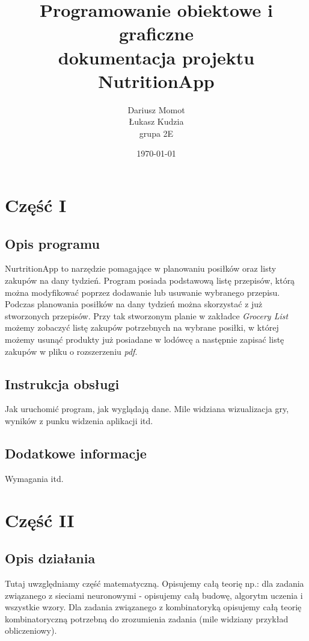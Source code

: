 \documentclass[12pt,a4paper]{article}
\begin{document}
	
	\title{Programowanie obiektowe i graficzne\\\small{dokumentacja projektu NutritionApp}}
	\author{Dariusz Momot \\ Łukasz Kudzia \\ grupa 2E}
	\date{\today}

	\maketitle
	\newpage
	\section*{Część I}
	\subsection*{Opis programu}
	NurtritionApp to narzędzie pomagające w planowaniu posiłków oraz listy zakupów na dany tydzień.
	Program posiada podstawową listę przepisów, którą można modyfikować poprzez dodawanie lub usuwanie wybranego przepisu.
	Podczas planowania posiłków na dany tydzień można skorzystać z już stworzonych przepisów.
	Przy tak stworzonym planie w zakładce \textit{Grocery List} możemy zobaczyć listę zakupów potrzebnych na wybrane posiłki,
	w której możemy usunąć produkty już posiadane w lodówcę a następnie zapisać listę zakupów w pliku o rozszerzeniu \textit{pdf}.
	
	\subsection*{Instrukcja obsługi}
	Jak uruchomić program, jak wyglądają dane. Mile widziana wizualizacja gry, wyników z punku widzenia aplikacji itd. 
	\subsection*{Dodatkowe informacje}
	Wymagania itd.
	\newpage
	\section*{Część II}
	\subsection*{Opis działania} 
	Tutaj uwzględniamy część matematyczną. Opisujemy całą teorię np.:
	dla zadania związanego z sieciami neuronowymi - opisujemy całą budowę, algorytm uczenia i wszystkie wzory. Dla zadania związanego z kombinatoryką opisujemy całą teorię kombinatoryczną potrzebną do zrozumienia zadania (mile widziany przykład obliczeniowy).
	
\end{document}
